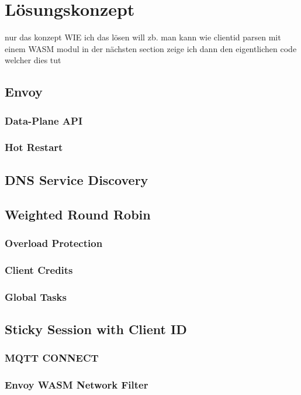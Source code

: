 \section{Lösungskonzept}
nur das konzept WIE ich das lösen will zb. man kann wie clientid parsen mit einem WASM modul
in der nächsten section zeige ich dann den eigentlichen code welcher dies tut

\subsection{Envoy}
\subsubsection{Data-Plane API}
\subsubsection{Hot Restart}

\subsection{DNS Service Discovery}

\subsection{Weighted Round Robin}
\subsubsection{Overload Protection}
\subsubsection{Client Credits}
\subsubsection{Global Tasks}

\subsection{Sticky Session with Client ID}
\subsubsection{MQTT CONNECT}
\subsubsection{Envoy WASM Network Filter}

